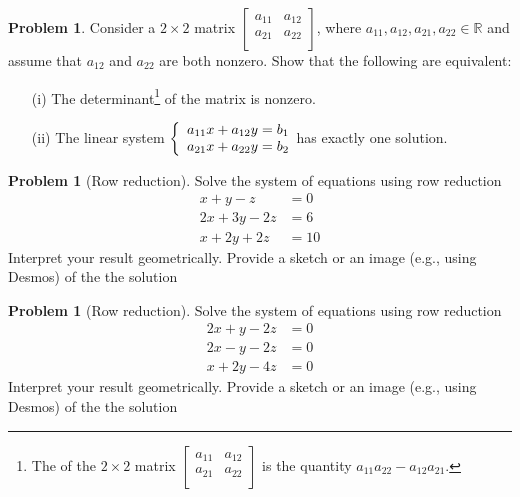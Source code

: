 \documentclass[10pt]{article}
\theoremstyle{definition}
\newtheorem{problem}[theorem]{Problem}
\newcommand{\1}[1]{\textbf{1}_{\left[#1\right]}} %
\def\R{\mathbb{R}} %
\newcommand{\dempfcolor}[1]{{\color{RoyalBlue}#1}}
\newcommand{\demph}[1]{\dempfcolor{{\sl #1}}}
\begin{document}
\begin{problem}
  Consider a $2\times 2$  matrix $\begin{bmatrix}
    a_{11}&a_{12}\\
    a_{21}&a_{22}\\
  \end{bmatrix}$, where $a_{11},a_{12},a_{21},a_{22}\in \R$ and assume that $a_{12}$ and
  $a_{22}$ are both nonzero. Show that the following are equivalent:
  \begin{enumerate}
    \item[(i)] The determinant\footnote{The \demph{determinant} of the
      $2\times 2$ matrix $
      \begin{bmatrix}
        a_{11}&a_{12}\\
        a_{21}&a_{22}\\
      \end{bmatrix}$
      is the quantity $a_{11}a_{22}-a_{12}a_{21}$.} of the matrix is nonzero.
    \item[(ii)] The linear system
    $\left\{ \begin{array}{l@{}l} a_{11}x+a_{12}y=b_{1} \\
        a_{21}x+a_{22}y=b_{2} \end{array}\right.$ has exactly one solution.
  \end{enumerate}
\end{problem}


\begin{problem}[Row reduction]
  Solve the system of equations using row reduction
  \begin{align*}
    x+y-z&=0\\
    2x+3y-2z&=6\\
    x+2y+2z&=10
  \end{align*}
  Interpret your result geometrically. Provide a sketch or an image (e.g.,
  using Desmos) of the the solution
\end{problem}

\begin{problem}[Row reduction]
  Solve the system of equations using row reduction
  \begin{align*}
    2x+y-2z&=0\\
    2x-y-2z&=0\\
    x+2y-4z&=0
  \end{align*}
  Interpret your result geometrically. Provide a sketch or an image (e.g.,
  using Desmos) of the the solution
\end{problem}
\end{document}
